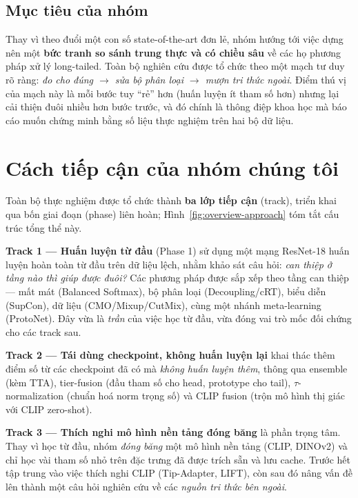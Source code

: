 \subsection{Mục tiêu của nhóm}

Thay vì theo đuổi một con số state-of-the-art đơn lẻ, nhóm hướng tới việc dựng nên một
\textbf{bức tranh so sánh trung thực và có chiều sâu} về các họ phương pháp xử lý long-tailed. Toàn
bộ nghiên cứu được tổ chức theo một mạch tư duy rõ ràng: \emph{đo cho đúng $\rightarrow$ sửa bộ phân
loại $\rightarrow$ mượn tri thức ngoài}. Điểm thú vị của mạch này là mỗi bước tuy ``rẻ'' hơn (huấn
luyện ít tham số hơn) nhưng lại cải thiện đuôi nhiều hơn bước trước, và đó chính là thông điệp khoa
học mà báo cáo muốn chứng minh bằng số liệu thực nghiệm trên hai bộ dữ liệu.

\section{Cách tiếp cận của nhóm chúng tôi}

Toàn bộ thực nghiệm được tổ chức thành \textbf{ba lớp tiếp cận} (track), triển khai qua bốn giai đoạn
(phase) liên hoàn; Hình~\ref{fig:overview-approach} tóm tắt cấu trúc tổng thể này.

\textbf{Track 1 --- Huấn luyện từ đầu} (Phase 1) sử dụng một mạng ResNet-18 huấn luyện hoàn toàn từ
đầu trên dữ liệu lệch, nhằm khảo sát câu hỏi: \emph{can thiệp ở tầng nào thì giúp được đuôi?} Các
phương pháp được sắp xếp theo tầng can thiệp --- mất mát (Balanced Softmax), bộ phân loại
(Decoupling/cRT), biểu diễn (SupCon), dữ liệu (CMO/Mixup/CutMix), cùng một nhánh meta-learning
(ProtoNet). Đây vừa là \emph{trần} của việc học từ đầu, vừa đóng vai trò mốc đối chứng cho các track
sau.

\textbf{Track 2 --- Tái dùng checkpoint, không huấn luyện lại} khai thác thêm điểm số từ
các checkpoint đã có mà \emph{không huấn luyện thêm}, thông qua ensemble (kèm TTA), tier-fusion (đầu
tham số cho head, prototype cho tail), $\tau$-normalization (chuẩn hoá norm trọng số) và CLIP fusion
(trộn mô hình thị giác với CLIP zero-shot).

\textbf{Track 3 --- Thích nghi mô hình nền tảng đóng băng} là phần trọng tâm.
Thay vì học từ đầu, nhóm \emph{đóng băng} một mô hình nền tảng (CLIP, DINOv2) và chỉ học vài tham số
nhỏ trên đặc trưng đã được trích sẵn và lưu cache. Trước hết tập trung vào việc thích nghi CLIP
(Tip-Adapter, LIFT), còn sau đó nâng vấn đề lên thành một câu hỏi nghiên cứu về các \emph{nguồn tri
thức bên ngoài}.

